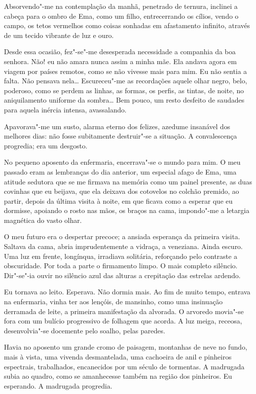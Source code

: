Absorvendo"-me na contemplação da manhã,
penetrado de ternura, inclinei a cabeça para o ombro de Ema, como um
filho, entrecerrando os cílios, vendo o campo, os tetos vermelhos como
coisas sonhadas em afastamento infinito, através de um tecido vibrante
de luz e ouro. 

Desde essa ocasião, fez"-se"-me desesperada
necessidade a companhia da boa senhora. Não! eu não amara nunca assim a
minha mãe. Ela andava agora em viagem por países remotos, como se não
vivesse mais para mim. Eu não sentia a falta. Não pensava nela\ldots{}
Escureceu"-me as recordações aquele olhar negro, belo, poderoso, como
se perdem as linhas, as formas, os perfis, as tintas, de noite, no
aniquilamento uniforme da sombra\ldots{} Bem pouco, um resto desfeito de
saudades para aquela inércia intensa, avassalando. 

Apavorava"-me um
susto, alarma eterno dos felizes, azedume insanável dos melhores dias:
não fosse subitamente destruir"-se a situação. A convalescença
progredia; era um desgosto. 

No pequeno aposento da enfermaria,
encerrava"-se o mundo para mim. O meu passado eram as lembranças do
dia anterior, um especial afago de Ema, uma atitude sedutora que se me
firmava na memória como um painel presente, as duas covinhas que eu
beijava, que ela deixava dos cotovelos no colchão premido, ao partir,
depois da última visita à noite, em que ficava como a esperar que eu
dormisse, apoiando o rosto nas mãos, os braços na cama, impondo"-me a
letargia magnética do vasto olhar. 

O meu futuro era o despertar
precoce; a ansiada esperança da primeira visita. Saltava da cama, abria
imprudentemente a vidraça, a veneziana. Ainda escuro. Uma luz em
frente, longínqua, irradiava solitária, reforçando pelo contraste a
obscuridade. Por toda a parte o firmamento limpo. O mais completo
silêncio. Dir"-se"-ia ouvir no silêncio azul das alturas a crepitação
das estrelas ardendo. 

Eu tornava ao leito. Esperava. Não dormia mais.
Ao fim de muito tempo, entrava na enfermaria, vinha ter aos lençóis, de
mansinho, como uma insinuação derramada de leite, a primeira
manifestação da alvorada. O arvoredo movia"-se fora com um bulício
progressivo de folhagem que acorda. A luz meiga, receosa,
desenvolvia"-se docemente pelo soalho, pelas paredes. 

Havia no aposento um grande cromo de paisagem, montanhas de neve no fundo, mais
à vista, uma vivenda desmantelada, uma cachoeira de anil e pinheiros
espectrais, trabalhados, encanecidos por um século de tormentas. A
madrugada subia ao quadro, como se amanhecesse também na região dos
pinheiros. Eu esperando. A madrugada progredia. 

